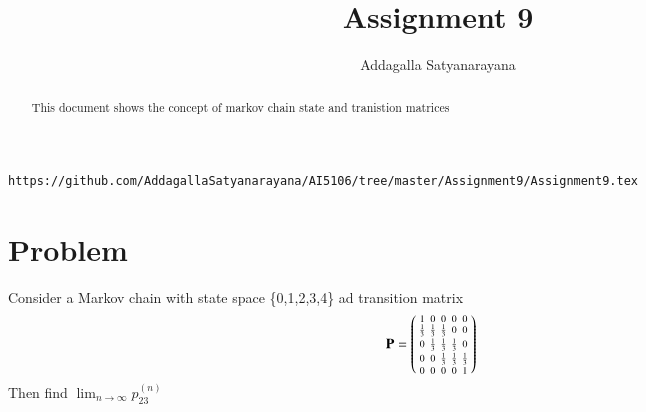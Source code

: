 \documentclass[journal,12pt,twocolumn]{IEEEtran}
\begin{document}
	\makeatother
	\let\StandardTheFigure\thefigure
	\let\vec\mathbf
	\renewcommand{\thefigure}{\theproblem}
	\def\putbox#1#2#3{\makebox[0in][l]{\makebox[#1][l]{}\raisebox{\baselineskip}[0in][0in]{\raisebox{#2}[0in][0in]{#3}}}}
	\def\rightbox#1{\makebox[0in][r]{#1}}
	\def\centbox#1{\makebox[0in]{#1}}
	\def\topbox#1{\raisebox{-\baselineskip}[0in][0in]{#1}}
	\def\midbox#1{\raisebox{-0.5\baselineskip}[0in][0in]{#1}}
	\vspace{3cm}
	\title{Assignment 9}
	\author{Addagalla Satyanarayana}
	\maketitle
	\newpage
	\bigskip
	\renewcommand{\thefigure}{\theenumi}
	\renewcommand{\thetable}{\theenumi}
\begin{abstract}
This document shows the concept of markov chain state and tranistion matrices
\end{abstract}

%
\begin{lstlisting}
https://github.com/AddagallaSatyanarayana/AI5106/tree/master/Assignment9/Assignment9.tex
\end{lstlisting}
%
\section{Problem}
	Consider a Markov chain with state space \{0,1,2,3,4\} ad transition matrix 
\begin{align}
\vec{P}&=\myvec{1&0&0&0&0\\\frac{1}{3}&\frac{1}{3}&\frac{1}{3}&0&0\\0 &\frac{1}{3}&\frac{1}{3}&\frac{1}{3}&0\\0&0&\frac{1}{3}&\frac{1}{3}&\frac{1}{3}\\0&0&0&0&1}\label{eq:Problem}
\end{align}
Then find $\lim_{n \to \infty} p_{23}^{(n)}$
\end{document}
